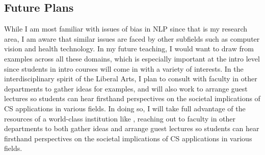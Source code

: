 \documentclass[12pt,letterpaper]{article}
\begin{document}
\subsection{Future Plans}
While I am most familiar with issues of bias in NLP since that is my research area, I am aware that similar issues are faced by other subfields such as computer vision and health technology.
In my future teaching, I would want to draw from examples across all these domains, which is especially important at the intro level since students in intro courses will come in with a variety of interests.
\ifliberalarts
In the interdisciplinary spirit of the Liberal Arts, I plan to consult with faculty in other departments to gather ideas for examples, and will also work to arrange guest lectures so students can hear firsthand perspectives on the societal implications of CS applications in various fields.
\else
In doing so, I will take full advantage of the resources of a world-class institution like \schoolname, reaching out to faculty in other departments to both gather ideas and arrange guest lectures so students can hear firsthand perspectives on the societal implications of CS applications in various fields.
\fi



\end{document}
